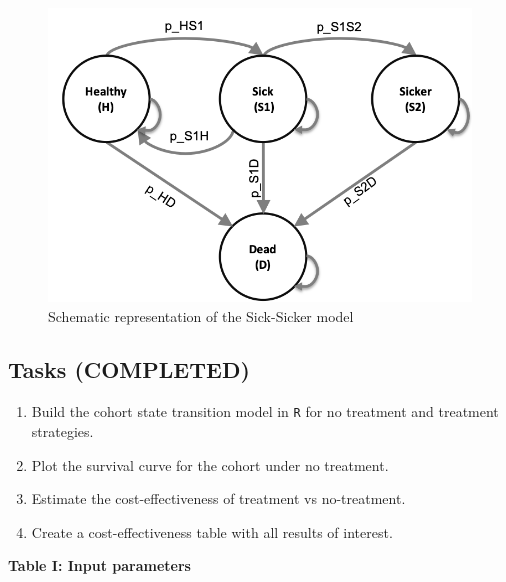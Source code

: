 \documentclass[
]{article}
\begin{document}
\begin{figure}

{\centering \includegraphics[width=1\linewidth]{sick_sicker_diagram} 

}

\caption{Schematic representation of the Sick-Sicker model}\label{fig:unnamed-chunk-1}
\end{figure}

\hypertarget{tasks-completed}{%
\subsection{Tasks (COMPLETED)}\label{tasks-completed}}

\begin{enumerate}
\def\labelenumi{\arabic{enumi}.}
\item
  Build the cohort state transition model in \texttt{R} for no treatment
  and treatment strategies.
\item
  Plot the survival curve for the cohort under no treatment.
\item
  Estimate the cost-effectiveness of treatment vs no-treatment.
\item
  Create a cost-effectiveness table with all results of interest.
\end{enumerate}

\textbf{Table I: Input parameters}
\end{document}
